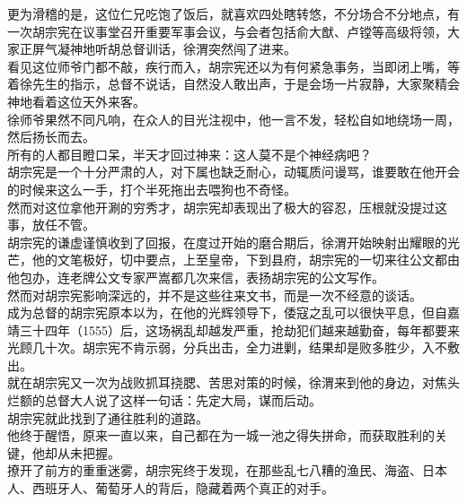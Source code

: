 \begin{multicols}{\theparacolNo}
更为滑稽的是，这位仁兄吃饱了饭后，就喜欢四处瞎转悠，不分场合不分地点，有一次胡宗宪在议事堂召开重要军事会议，与会者包括俞大猷、卢镗等高级将领，大家正屏气凝神地听胡总督训话，徐渭突然闯了进来。\\

看见这位师爷门都不敲，疾行而入，胡宗宪还以为有何紧急事务，当即闭上嘴，等着徐先生的指示，总督不说话，自然没人敢出声，于是会场一片寂静，大家聚精会神地看着这位天外来客。\\

徐师爷果然不同凡响，在众人的目光注视中，他一言不发，轻松自如地绕场一周，然后扬长而去。\\

所有的人都目瞪口呆，半天才回过神来：这人莫不是个神经病吧？\\

胡宗宪是一个十分严肃的人，对下属也缺乏耐心，动辄质问谩骂，谁要敢在他开会的时候来这么一手，打个半死拖出去喂狗也不奇怪。\\

然而对这位拿他开涮的穷秀才，胡宗宪却表现出了极大的容忍，压根就没提过这事，放任不管。\\

胡宗宪的谦虚谨慎收到了回报，在度过开始的磨合期后，徐渭开始映射出耀眼的光芒，他的文笔极好，切中要点，上至皇帝，下到县府，胡宗宪的一切来往公文都由他包办，连老牌公文专家严嵩都几次来信，表扬胡宗宪的公文写作。\\

然而对胡宗宪影响深远的，并不是这些往来文书，而是一次不经意的谈话。\\

成为总督的胡宗宪原本以为，在他的光辉领导下，倭寇之乱可以很快平息，但自嘉靖三十四年（1555）后，这场祸乱却越发严重，抢劫犯们越来越勤奋，每年都要来光顾几十次。胡宗宪不肯示弱，分兵出击，全力进剿，结果却是败多胜少，入不敷出。\\

就在胡宗宪又一次为战败抓耳挠腮、苦思对策的时候，徐渭来到他的身边，对焦头烂额的总督大人说了这样一句话：先定大局，谋而后动。\\

胡宗宪就此找到了通往胜利的道路。\\

他终于醒悟，原来一直以来，自己都在为一城一池之得失拼命，而获取胜利的关键，他却从未把握。\\

撩开了前方的重重迷雾，胡宗宪终于发现，在那些乱七八糟的渔民、海盗、日本人、西班牙人、葡萄牙人的背后，隐藏着两个真正的对手。\\
\ifnum{}
	\end{multicols}
\fi
\newpage
